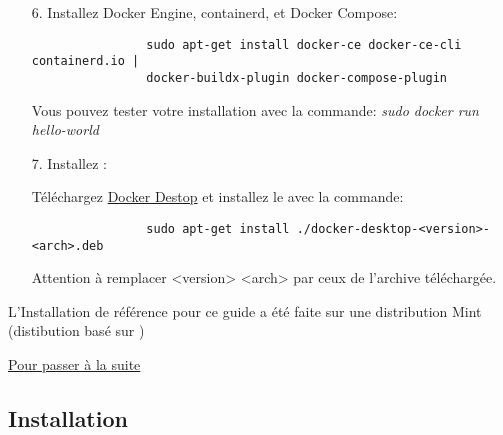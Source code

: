 \begin{itemize}
        \item[6.] Installez Docker Engine, containerd, et Docker Compose:

            \begin{lstlisting}
                sudo apt-get install docker-ce docker-ce-cli containerd.io | 
                docker-buildx-plugin docker-compose-plugin
            \end{lstlisting}
            \begin{footnotesize}
                Vous pouvez tester votre installation avec la commande: \textit{sudo docker run hello-world}
            \end{footnotesize}

            \bigskip
        \item[7.] Installez \dockerdesktop{}:

        
            \begin{footnotesize}
                Téléchargez \href{https://desktop.docker.com/linux/main/amd64/docker-desktop-4.17.0-amd64.deb?utm_source=docker&utm_medium=webreferral&utm_campaign=docs-driven-download-linux-amd64}{Docker Destop} et installez le avec la commande:
            \end{footnotesize}

            \begin{lstlisting}
                sudo apt-get install ./docker-desktop-<version>-<arch>.deb
            \end{lstlisting}

            \begin{footnotesize}
                Attention à remplacer <version> <arch> par ceux de l'archive téléchargée.
            \end{footnotesize}

    \end{itemize}

    \bigskip

    \begin{footnotesize}
        L'Installation de référence pour ce guide a été faite sur une distribution \linux{} Mint (distibution basé sur \ubuntu{})\\
    \end{footnotesize}

    \hyperref[sec:suite_installation]{Pour passer à la suite}

\newpage

\subsection[Installation Windows]{Installation \windows{}\label{sec:installation_windows}}

